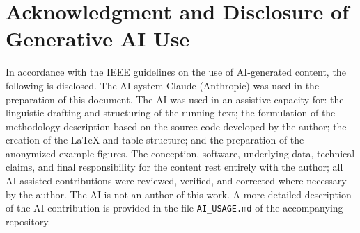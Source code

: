 \documentclass[conference]{IEEEtran}
\begin{document}
\section*{Acknowledgment and Disclosure of Generative AI Use}
In accordance with the IEEE guidelines on the use of AI-generated content, the
following is disclosed. The AI system Claude (Anthropic) was used in the
preparation of this document. The AI was used in an assistive capacity for: the
linguistic drafting and structuring of the running text; the formulation of the
methodology description based on the source code developed by the author; the
creation of the LaTeX and table structure; and the preparation of the anonymized
example figures. The conception, software, underlying data, technical claims, and
final responsibility for the content rest entirely with the author; all
AI-assisted contributions were reviewed, verified, and corrected where necessary
by the author. The AI is not an author of this work. A more detailed description
of the AI contribution is provided in the file \texttt{AI\_USAGE.md} of the
accompanying repository.
\end{document}
